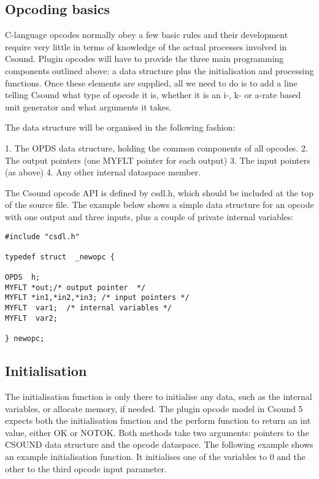 \documentclass[11pt]{article}
\begin{document}
\subsection {Opcoding basics}
C-language opcodes normally obey a few basic rules and their development require very little in terms of knowledge of the actual processes involved in Csound. Plugin opcodes will have to provide the three main programming components outlined above: a data structure plus the initialisation and processing functions. Once these elements are supplied, all we need to do is to add a line telling Csound what type of opcode it is, whether it is an i-, k- or a-rate based unit generator and what arguments it takes. 

The data structure will be organised in the following fashion:

1.	The OPDS data structure, holding the common components of all opcodes.
2.	The output pointers (one MYFLT pointer for each output)
3.	The input pointers (as above)
4.	Any other internal dataspace member.

The Csound opcode API is defined by csdl.h, which should be included at the top of the source file. The example below shows a simple data structure for an opcode with one output and three inputs, plus a couple of private internal variables:

\begin{lstlisting}
#include "csdl.h"

typedef struct  _newopc {

OPDS  h;
MYFLT *out;/* output pointer  */
MYFLT *in1,*in2,*in3; /* input pointers */
MYFLT  var1;  /* internal variables */
MYFLT  var2;  

} newopc;
\end{lstlisting}

\subsection{Initialisation}

The initialisation function is only there to initialise any data, such as the internal variables, or allocate memory, if needed. The plugin opcode model in Csound 5 expects both the initialisation function and the perform function to return an int value, either OK or NOTOK. Both methods  take two arguments:  pointers to the CSOUND data structure and the opcode dataspace. The following example shows an example initialisation function. It initialises one of the variables to 0 and the other to the third opcode input parameter.
\end{document}
